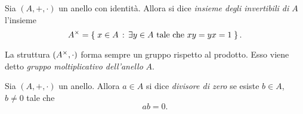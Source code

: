 \begin{definition} 
    \label{def:invertibili}
    Sia $(A, +, \cdot)$ un anello con identità. Allora si dice \emph{insieme degli invertibili di $A$} l'insieme \[
        A^{\times} = \left\{\;x \in A \,:\, \exists y \in A \text{ tale che } xy = yx = 1\;\right\}.
    \]
\end{definition}

\begin{remark}
    La struttura $(A^{\times}, \cdot)$ forma sempre un gruppo rispetto al prodotto. Esso viene detto \emph{gruppo moltiplicativo dell'anello} $A$.
\end{remark}

\begin{definition}
    \label{def:div_zero}
    Sia $(A, +, \cdot)$ un anello. Allora $a \in A$ si dice \emph{divisore di zero} se esiste $b \in A$, $b \neq 0$ tale che \[
        ab = 0.
    \]
\end{definition}

